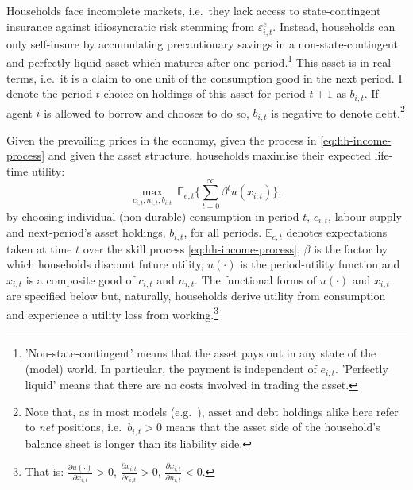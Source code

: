 \documentclass[a4paper,12pt]{article} %
\numberwithin{equation}{section} %
\numberwithin{figure}{section}
\numberwithin{table}{section}
\begin{document}
Households face incomplete markets, i.e.~they lack access to state-contingent insurance against idiosyncratic risk stemming from $\varepsilon^e_{i,t}$. Instead, households can only self-insure by accumulating precautionary savings in a non-state-contingent and perfectly liquid asset which matures after one period.\footnote{'Non-state-contingent' means that the asset pays out in any state of the (model) world. In particular, the payment is independent of $e_{i,t}$. 'Perfectly liquid' means that there are no costs involved in trading the asset.} This asset is in real terms, i.e.~it is a claim to one unit of the consumption good in the next period. I denote the period-$t$ choice on holdings of this asset for period $t+1$ as $b_{i,t}$. If agent $i$ is allowed to borrow and chooses to do so, $b_{i,t}$ is negative to denote debt.\footnote{Note that, as in most models (e.g.~\cite{kaplan2018}), asset and debt holdings alike here refer to \textit{net} positions, i.e.~$b_{i,t} > 0$ means that the asset side of the household's balance sheet is longer than its liability side.} %

Given the prevailing prices in the economy, given the process in \eqref{eq:hh-income-process} and given the asset structure, households maximise their expected life-time utility:
\begin{equation}
    \max_{c_{i,t}, n_{i,t}, b_{i,t}} \ \mathbb{E}_{e,t} \Bigg\{ \sum_{t=0}^{\infty} \beta^t u(x_{i,t}) \Bigg\}, \label{eq:hh-objective}
\end{equation}
by choosing individual (non-durable) consumption in period $t$, $c_{i,t}$, labour supply and next-period's asset holdings, $b_{i,t}$, for all periods. $\mathbb{E}_{e,t}$ denotes expectations taken at time $t$ over the skill process \eqref{eq:hh-income-process}, $\beta$ is the factor by which households discount future utility, $u( \cdot )$ is the period-utility function and $x_{i,t}$ is a composite good of $c_{i,t}$ and $n_{i,t}$. The functional forms of $u( \cdot )$ and $x_{i,t}$ are specified below but, naturally, households derive utility from consumption and experience a utility loss from working.\footnote{That is: $\frac{\partial u( \cdot )}{\partial x_{i,t}} > 0$, $\frac{\partial x_{i,t}}{\partial c_{i,t}} > 0$, $\frac{\partial x_{i,t}}{\partial n_{i,t}} < 0$.} %
\end{document}
